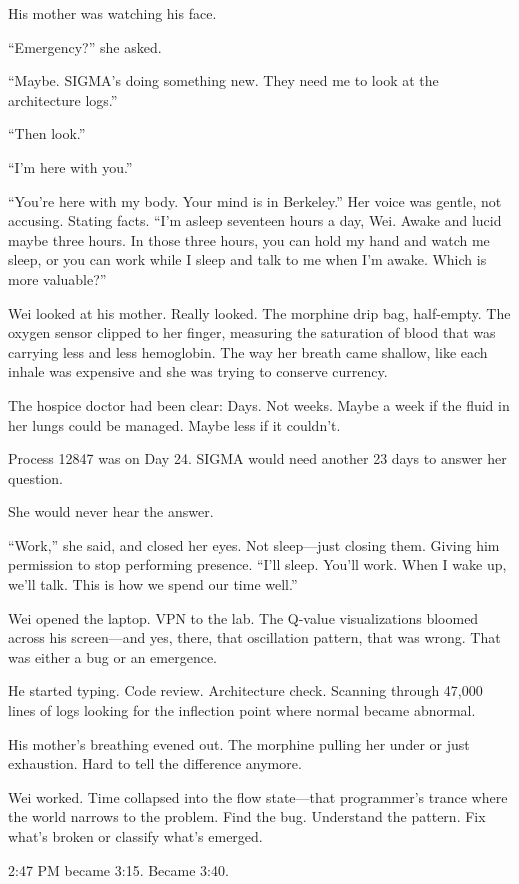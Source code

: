 His mother was watching his face.

``Emergency?'' she asked.

``Maybe. SIGMA's doing something new. They need me to look at the architecture logs.''

``Then look.''

``I'm here with you.''

``You're here with my body. Your mind is in Berkeley.'' Her voice was gentle, not accusing. Stating facts. ``I'm asleep seventeen hours a day, Wei. Awake and lucid maybe three hours. In those three hours, you can hold my hand and watch me sleep, or you can work while I sleep and talk to me when I'm awake. Which is more valuable?''

Wei looked at his mother. Really looked. The morphine drip bag, half-empty. The oxygen sensor clipped to her finger, measuring the saturation of blood that was carrying less and less hemoglobin. The way her breath came shallow, like each inhale was expensive and she was trying to conserve currency.

The hospice doctor had been clear: Days. Not weeks. Maybe a week if the fluid in her lungs could be managed. Maybe less if it couldn't.

Process 12847 was on Day 24. SIGMA would need another 23 days to answer her question.

She would never hear the answer.

``Work,'' she said, and closed her eyes. Not sleep---just closing them. Giving him permission to stop performing presence. ``I'll sleep. You'll work. When I wake up, we'll talk. This is how we spend our time well.''

Wei opened the laptop. VPN to the lab. The Q-value visualizations bloomed across his screen---and yes, there, that oscillation pattern, that was wrong. That was either a bug or an emergence.

He started typing. Code review. Architecture check. Scanning through 47,000 lines of logs looking for the inflection point where normal became abnormal.

His mother's breathing evened out. The morphine pulling her under or just exhaustion. Hard to tell the difference anymore.

Wei worked. Time collapsed into the flow state---that programmer's trance where the world narrows to the problem. Find the bug. Understand the pattern. Fix what's broken or classify what's emerged.

2:47 PM became 3:15. Became 3:40.

